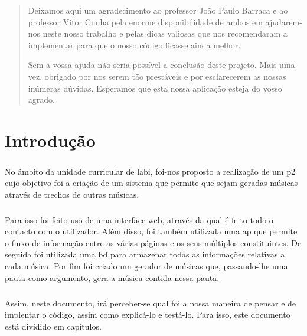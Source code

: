 \documentclass[a4paper]{report}
\begin{document}

\renewcommand{\abstractname}{Agradecimentos}
\begin{abstract}

Deixamos aqui um agradecimento ao professor João Paulo Barraca e ao professor Vitor Cunha pela enorme disponibilidade de ambos em ajudarem-nos neste nosso trabalho e pelas dicas valiosas que nos recomendaram a implementar para que o nosso código ficasse ainda melhor. 

Sem a vossa ajuda não seria possível a conclusão deste projeto. 
Mais uma vez, obrigado por nos serem tão prestáveis e por esclarecerem as nossas inúmeras dúvidas. Esperamos que esta nossa aplicação esteja do vosso agrado.

\end{abstract}

\tableofcontents  

\clearpage
{}

\chapter{Introdução}
\label{chap.introducao}
\paragraph{}No âmbito da unidade curricular de \ac{labi}, foi-nos proposto a realização de um \ac{p2} cujo objetivo foi a criação de um sistema que permite que sejam geradas músicas através de trechos de outras músicas. 

\paragraph{}Para isso foi feito uso de uma 	interface web, através da qual é feito todo o contacto com o utilizador. Além disso, foi também utilizada uma \ac{ap} que permite o fluxo de informação entre as várias páginas e os seus múltiplos constituintes. De seguida foi utilizada uma \ac{bd} para armazenar todas as informações relativas a cada música. Por fim foi criado um gerador de músicas que, passando-lhe uma pauta como argumento, gera a música contida nessa pauta. 

\paragraph{}Assim, neste documento, irá perceber-se qual foi a nossa maneira de pensar e de implentar o código, assim como explicá-lo e testá-lo. Para isso, este documento está dividido em  capítulos.
\end{document}
